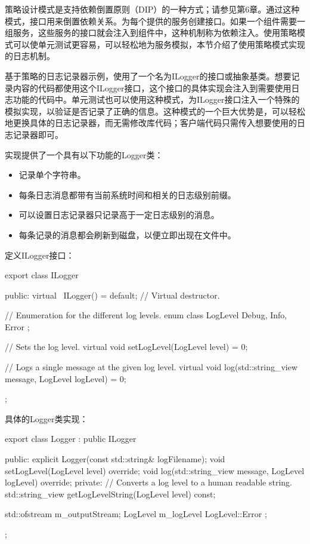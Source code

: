 
策略设计模式是支持依赖倒置原则（DIP）的一种方式；请参见第6章。通过这种模式，接口用来倒置依赖关系。为每个提供的服务创建接口。如果一个组件需要一组服务，这些服务的接口就会注入到组件中，这种机制称为依赖注入。使用策略模式可以使单元测试更容易，可以轻松地为服务模拟，本节介绍了使用策略模式实现的日志机制。


基于策略的日志记录器示例，使用了一个名为ILogger的接口或抽象基类。想要记录内容的代码都使用这个ILogger接口，这个接口的具体实现会注入到需要使用日志功能的代码中。单元测试也可以使用这种模式，为ILogger接口注入一个特殊的模拟实现，以验证是否记录了正确的信息。这种模式的一个巨大优势是，可以轻松地更换具体的日志记录器，而无需修改库代码；客户端代码只需传入想要使用的日志记录器即可。


实现提供了一个具有以下功能的Logger类：

\begin{itemize}
\item
记录单个字符串。

\item
每条日志消息都带有当前系统时间和相关的日志级别前缀。

\item
可以设置日志记录器只记录高于一定日志级别的消息。

\item
每条记录的消息都会刷新到磁盘，以便立即出现在文件中。
\end{itemize}

定义ILogger接口：

\begin{cpp}
export class ILogger
{
    public:
        virtual ~ILogger() = default; // Virtual destructor.

        // Enumeration for the different log levels.
        enum class LogLevel { Debug, Info, Error };

        // Sets the log level.
        virtual void setLogLevel(LogLevel level) = 0;

        // Logs a single message at the given log level.
        virtual void log(std::string_view message, LogLevel logLevel) = 0;
};
\end{cpp}

具体的Logger类实现：

\begin{cpp}
export class Logger : public ILogger
{
    public:
        explicit Logger(const std::string& logFilename);
        void setLogLevel(LogLevel level) override;
        void log(std::string_view message, LogLevel logLevel) override;
    private:
        // Converts a log level to a human readable string.
        std::string_view getLogLevelString(LogLevel level) const;

        std::ofstream m_outputStream;
        LogLevel m_logLevel { LogLevel::Error };
};
\end{cpp}

